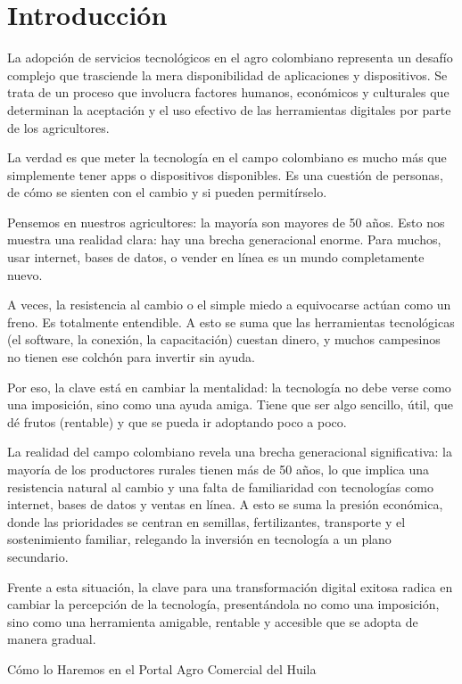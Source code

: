 \section{Introducción}

La adopción de servicios tecnológicos en el agro colombiano representa un desafío complejo que trasciende la mera disponibilidad de aplicaciones y dispositivos. Se trata de un proceso que involucra factores humanos, económicos y culturales que determinan la aceptación y el uso efectivo de las herramientas digitales por parte de los agricultores.

La verdad es que meter la tecnología en el campo colombiano es mucho más que simplemente tener apps o dispositivos disponibles. Es una cuestión de personas, de cómo se sienten con el cambio y si pueden permitírselo.

Pensemos en nuestros agricultores: la mayoría son mayores de 50 años. Esto nos muestra una realidad clara: hay una brecha generacional enorme. Para muchos, usar internet, bases de datos, o vender en línea es un mundo completamente nuevo.

A veces, la resistencia al cambio o el simple miedo a equivocarse actúan como un freno. Es totalmente entendible. A esto se suma que las herramientas tecnológicas (el software, la conexión, la capacitación) cuestan dinero, y muchos campesinos no tienen ese colchón para invertir sin ayuda.

Por eso, la clave está en cambiar la mentalidad: la tecnología no debe verse como una imposición, sino como una ayuda amiga. Tiene que ser algo sencillo, útil, que dé frutos (rentable) y que se pueda ir adoptando poco a poco.

La realidad del campo colombiano revela una brecha generacional significativa: la mayoría de los productores rurales tienen más de 50 años, lo que implica una resistencia natural al cambio y una falta de familiaridad con tecnologías como internet, bases de datos y ventas en línea. A esto se suma la presión económica, donde las prioridades se centran en semillas, fertilizantes, transporte y el sostenimiento familiar, relegando la inversión en tecnología a un plano secundario.

Frente a esta situación, la clave para una transformación digital exitosa radica en cambiar la percepción de la tecnología, presentándola no como una imposición, sino como una herramienta amigable, rentable y accesible que se adopta de manera gradual.

Cómo lo Haremos en el Portal Agro Comercial del Huila

